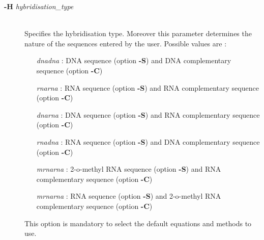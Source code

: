 \documentclass{article}
\begin{document}
\begin{description}
\item [\textbf{-H} \textit{hybridisation\_type}]\mbox{}\\
  Specifies the hybridisation type. Moreover this parameter determines the nature of the sequences entered by the user.
  Possible values are :
  \begin{itemize}
  \item [\textit{dnadna}] : DNA sequence (option \textbf{-S}) and DNA complementary sequence (option \textbf{-C})
  \item [\textit{rnarna}] : RNA sequence (option \textbf{-S}) and RNA complementary sequence (option \textbf{-C})
  \item [\textit{dnarna}] : DNA sequence (option \textbf{-S}) and RNA complementary sequence (option \textbf{-C})
  \item [\textit{rnadna}] : RNA sequence (option \textbf{-S}) and DNA complementary sequence (option \textbf{-C})
  \item [\textit{mrnarna}] : 2-o-methyl RNA sequence (option \textbf{-S}) and RNA complementary sequence (option \textbf{-C})
  \item [\textit{mrnarna}] : RNA sequence (option \textbf{-S}) and 2-o-methyl RNA complementary sequence (option \textbf{-C})
  \end{itemize}
  This option is mandatory to select the default equations and methods to use.
\end{description}
\end{document}
